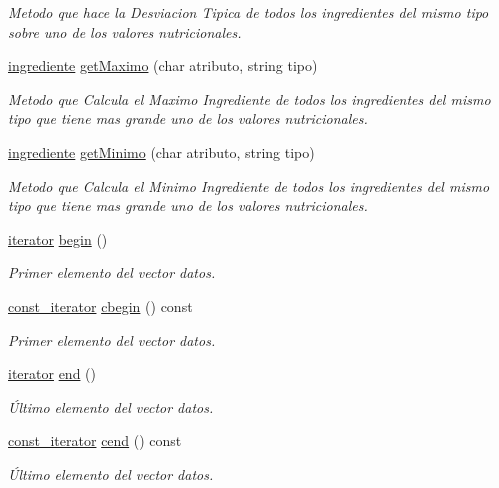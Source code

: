 \begin{DoxyCompactItemize}
\begin{DoxyCompactList}\small\item\em Metodo que hace la Desviacion Tipica de todos los ingredientes del mismo tipo sobre uno de los valores nutricionales. \end{DoxyCompactList}\item 
\hyperlink{classingrediente}{ingrediente} \hyperlink{classingredientes_a6e4cfe264fddd851ccf2f2061d6b66ce}{get\+Maximo} (char atributo, string tipo)
\begin{DoxyCompactList}\small\item\em Metodo que Calcula el Maximo Ingrediente de todos los ingredientes del mismo tipo que tiene mas grande uno de los valores nutricionales. \end{DoxyCompactList}\item 
\hyperlink{classingrediente}{ingrediente} \hyperlink{classingredientes_a0ec4fb15cad1b31709b24751abdf2067}{get\+Minimo} (char atributo, string tipo)
\begin{DoxyCompactList}\small\item\em Metodo que Calcula el Minimo Ingrediente de todos los ingredientes del mismo tipo que tiene mas grande uno de los valores nutricionales. \end{DoxyCompactList}\item 
\hyperlink{classingredientes_af0cadce160cefe5482ca7d55ef86c893}{iterator} \hyperlink{classingredientes_a9d61c6347e216b9f99264982ad8e6074}{begin} ()
\begin{DoxyCompactList}\small\item\em Primer elemento del vector datos. \end{DoxyCompactList}\item 
\hyperlink{classingredientes_ac84040efbb789929ebe9177605bb890a}{const\+\_\+iterator} \hyperlink{classingredientes_a40fdccf1fc4542ea0774a79cfc83e070}{cbegin} () const
\begin{DoxyCompactList}\small\item\em Primer elemento del vector datos. \end{DoxyCompactList}\item 
\hyperlink{classingredientes_af0cadce160cefe5482ca7d55ef86c893}{iterator} \hyperlink{classingredientes_a52a01bdabf8b52426c12976badcee775}{end} ()
\begin{DoxyCompactList}\small\item\em Último elemento del vector datos. \end{DoxyCompactList}\item 
\hyperlink{classingredientes_ac84040efbb789929ebe9177605bb890a}{const\+\_\+iterator} \hyperlink{classingredientes_a5149813ebd368e888102e69b3d9c54e8}{cend} () const
\begin{DoxyCompactList}\small\item\em Último elemento del vector datos. \end{DoxyCompactList}\end{DoxyCompactItemize}
